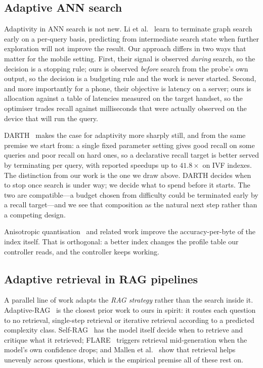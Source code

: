 \documentclass[conference]{IEEEtran}
\begin{document}
\subsection{Adaptive ANN search}

Adaptivity in ANN search is not new. Li et
al.~\cite{li2020earlytermination} learn to terminate graph search early on a
per-query basis, predicting from intermediate search state when further
exploration will not improve the result. Our approach differs in two ways that
matter for the mobile setting. First, their signal is observed \emph{during}
search, so the decision is a stopping rule; ours is observed \emph{before}
search from the probe's own output, so the decision is a budgeting rule and the
work is never started. Second, and more importantly for a phone, their
objective is latency on a server; ours is allocation against a table of
latencies measured on the target handset, so the optimiser trades recall
against milliseconds that were actually observed on the device that will run
the query.

DARTH~\cite{chatzakis2025darth} makes the case for adaptivity more sharply
still, and from the same premise we start from: a single fixed parameter
setting gives good recall on some queries and poor recall on hard ones, so a
declarative recall target is better served by terminating per query, with
reported speedups up to $41.8\times$ on IVF indexes. The distinction from our
work is the one we draw above. DARTH decides when to stop once search is under
way; we decide what to spend before it starts. The two are compatible---a
budget chosen from difficulty could be terminated early by a recall target---and
we see that composition as the natural next step rather than a competing design.

Anisotropic quantisation~\cite{guo2020scann} and related work improve the
accuracy-per-byte of the index itself. That is orthogonal: a better index
changes the profile table our controller reads, and the controller keeps
working.

\subsection{Adaptive retrieval in RAG pipelines}
\label{sec:rel-adaptive-rag}

A parallel line of work adapts the \emph{RAG strategy} rather than the search
inside it. Adaptive-RAG~\cite{jeong2024adaptiverag} is the closest prior work
to ours in spirit: it routes each question to no retrieval, single-step
retrieval or iterative retrieval according to a predicted complexity class.
Self-RAG~\cite{asai2024selfrag} has the model itself decide when to retrieve
and critique what it retrieved; FLARE~\cite{jiang2023flare} triggers retrieval
mid-generation when the model's own confidence drops; and Mallen et
al.~\cite{mallen2023whennot} show that retrieval helps unevenly across
questions, which is the empirical premise all of these rest on.
\end{document}
